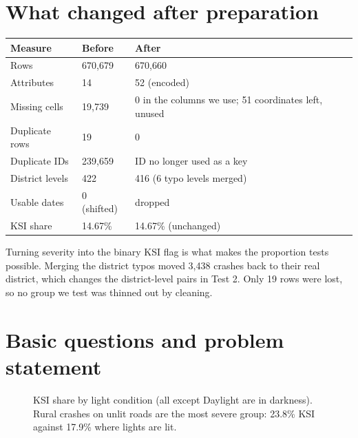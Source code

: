 \documentclass[10pt,a4paper,twocolumn]{article}
\begin{document}
\section{What changed after preparation}

{\footnotesize
\begin{tabularx}{\linewidth}{@{}L{2.9cm} L{1.7cm} Y@{}}
\toprule
\textbf{Measure} & \textbf{Before} & \textbf{After} \\
\midrule
Rows & 670{,}679 & 670{,}660 \\
Attributes & 14 & 52 (encoded) \\
Missing cells & 19{,}739 & 0 in the columns we use; 51 coordinates left, unused \\
Duplicate rows & 19 & 0 \\
Duplicate IDs & 239{,}659 & ID no longer used as a key \\
District levels & 422 & 416 (6 typo levels merged) \\
Usable dates & 0 (shifted) & dropped \\
KSI share & 14.67\% & 14.67\% (unchanged) \\
\bottomrule
\end{tabularx}}

Turning severity into the binary KSI flag is what makes the proportion tests possible. Merging
the district typos moved 3{,}438 crashes back to their real district, which changes the
district-level pairs in Test 2. Only 19 rows were lost, so no group we test was thinned out by
cleaning.

\section{Basic questions and problem statement}

\begin{figure}[!ht]
\centering
{}
\caption{KSI share by light condition (all except Daylight are in darkness). Rural crashes on
unlit roads are the most severe group: 23.8\% KSI against 17.9\% where lights are lit.}
\label{fig:light}
\end{figure}
\end{document}
